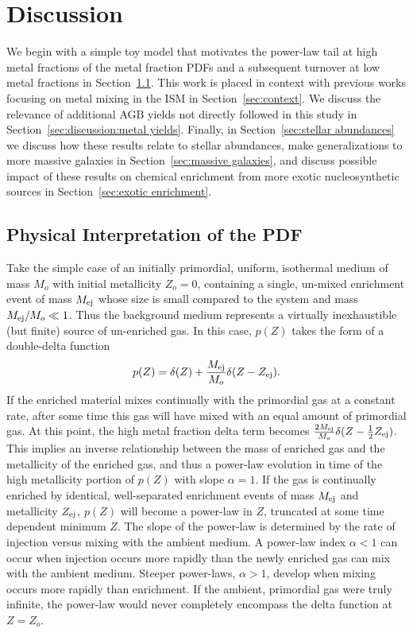 \documentclass[twocolumn]{aastex61}
\begin{document}
\section{Discussion}
\label{sec:discussion}
We begin with a simple toy model that motivates the power-law tail at high metal fractions of the metal fraction PDFs and a subsequent turnover at low metal fractions in Section~\ref{sec:interpretation}. This work is placed in context with previous works focusing on metal mixing in the ISM in Section~\ref{sec:context}. We discuss the relevance of additional AGB yields not directly followed in this study in Section~\ref{sec:discussion:metal yields}. Finally, in Section~\ref{sec:stellar abundances} we discuss how these results relate to stellar abundances, make generalizations to more massive galaxies in Section~\ref{sec:massive galaxies}, and discuss possible impact of these results on chemical enrichment from more exotic nucleosynthetic sources in Section~\ref{sec:exotic enrichment}.

\subsection{Physical Interpretation of the PDF}
\label{sec:interpretation}
Take the simple case of an initially primordial, uniform, isothermal medium of mass $M_o$ with initial metallicity $Z_o = 0$, containing a single, un-mixed enrichment event of mass $M_{\rm ej}$ whose size is small compared to the system and mass $M_{\rm ej} / M_o \ll 1$. Thus the background medium represents a virtually inexhaustible (but finite) source of un-enriched gas. In this case, $p(Z)$ takes the form of a double-delta function
\begin{equation}
p(Z) = \delta(Z) + \frac{M_{\rm ej}}{M_o}\delta(Z - Z_{\rm ej}).
\end{equation}
If the enriched material mixes continually with the primordial gas at a constant rate, after some time this gas will have mixed with an equal amount of primordial gas. At this point, the high metal fraction delta term becomes $\frac{2M_{\rm ej}}{M_o} \delta(Z - \frac{1}{2}Z_{\rm ej})$. This implies an inverse relationship between the mass of enriched gas and the metallicity of the enriched gas, and thus a power-law evolution in time of the high metallicity portion of $p(Z)$ with slope $\alpha = 1$. If the gas is continually enriched by identical, well-separated enrichment events of mass $M_{\rm ej}$ and metallicity $Z_{\rm ej}$, $p(Z)$ will become a power-law in $Z$, truncated at some time dependent minimum $Z$. The slope of the power-law is determined by the rate of injection versus mixing with the ambient medium. A power-law index $\alpha < 1$ can occur when injection occurs more rapidly than the newly enriched gas can mix with the ambient medium. Steeper power-laws, $\alpha > 1$, develop when mixing occurs more rapidly than enrichment. If the ambient, primordial gas were truly infinite, the power-law would never completely encompass the delta function at $Z = Z_o$.
\end{document}
